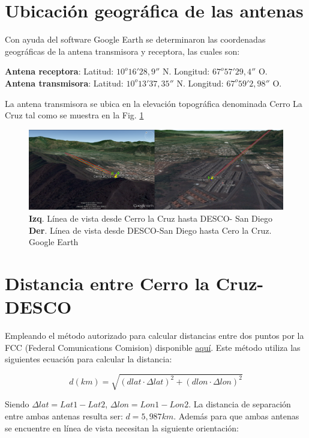 \documentclass[11pt, a4paper, twosides]{report}
\begin{document}
\section{Ubicación geográfica de las antenas}
Con ayuda del software Google Earth se determinaron las coordenadas geográficas de
la antena transmisora y receptora, las cuales son:

\noindent \textbf{Antena receptora}: Latitud: $10^{o}16'28,9''$ N. Longitud: $67^{o}57'29,4''$ O.\\
\noindent \textbf{Antena transmisora}: Latitud: $10^{o}13'37,35''$ N. Longitud: $67^{o}59'2,98''$ O.

La antena transmisora se ubica en la elevación topográfica denominada Cerro La Cruz tal como se muestra en la Fig. \ref{fig:ubiq}
\begin{figure}[h]
    \centering
    \includegraphics[width=1\linewidth]{ubiq.png}
    \caption{\textbf{Izq}. Línea de vista desde Cerro la Cruz hasta DESCO- San               Diego\\
            \textbf{Der}. Línea de vista desde  DESCO-San Diego hasta Cero la Cruz. Google Earth}
    \label{fig:ubiq}
\end{figure}

\section{Distancia entre Cerro la Cruz-DESCO }
\label{chap:radio}
Empleando el método autorizado para calcular distancias entre dos puntos por la FCC (Federal Comunications Comision) disponible \href{https://www.fcc.gov/media/radio/distance-and-azimuths}{aquí}. Este método utiliza las siguientes ecuación para calcular la distancia:

\begin{equation}
    d(km) = \sqrt{(dlat \cdot \Delta lat)^{2} + (dlon \cdot \Delta lon)^{2}}
\end{equation}

Siendo $\Delta lat = Lat1 - Lat2$, $\Delta lon = Lon1 - Lon2$. La distancia de separación entre ambas antenas resulta ser: \textbf{$d = 5,987 km$}. Además para que ambas antenas se encuentre en línea de vista necesitan la siguiente orientación: 
\end{document}
